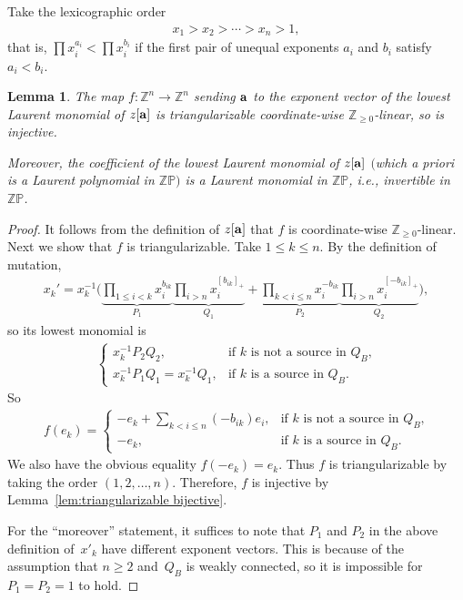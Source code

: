 \documentclass[pdftex]{sigma}
\numberwithin{equation}{section}
\newtheorem{Lemma}[Theorem]{Lemma}
\begin{document}
Take the lexicographic order
\begin{gather*}
x_1>x_2>\cdots >x_n>1,
\end{gather*}
 that is, $\prod x_i^{a_i}< \prod x_i^{b_i}$ if the f\/irst pair of unequal exponents $a_i$ and $b_i$ satisfy $a_i<b_i$.



\begin{Lemma}\label{lem:l injective}
The map $f\colon \mathbb{Z}^n\to\mathbb{Z}^n$ sending ${\bf a}$ to the exponent vector of the lowest Laurent monomial of $z[{\bf a}]$ is triangularizable coordinate-wise $\mathbb{Z}_{\ge0}$-linear, so is injective.

Moreover, the coefficient of the lowest Laurent monomial of $z[{\bf a}]$ $($which a priori is a Laurent polynomial in $\mathbb{ZP})$ is a Laurent monomial in $\mathbb{ZP}$, i.e., invertible in $\mathbb{ZP}$.
\end{Lemma}

\begin{proof}
It follows from the def\/inition of $z[{\bf a}]$ that $f$ is coordinate-wise $\mathbb{Z}_{\ge0}$-linear.
Next we show that $f$ is triangularizable. Take $1\le k\le n$. By the def\/inition of mutation,
\begin{gather*}
x_k' = x_k^{-1} \Bigg( \underbrace{\prod_{1\leq i<k} x_i^{b_{ik}}}_{P_1} \underbrace{\prod_{i>n} x_i^{[b_{ik}]_+}}_{Q_1} + \underbrace{\prod_{k < i \leq n} x_i^{-b_{ik}}}_{P_2} \underbrace{\prod_{i>n} x_i^{[-b_{ik}]_+}}_{Q_2} \Bigg),
\end{gather*}
so its lowest monomial is
\begin{gather*}
 \begin{cases} x_k^{-1} P_2 Q_2, & \text{if $k$ is not a source in $Q_B$,}  \\ x_k^{-1} P_1Q_1=
x_k^{-1} Q_1, & \text{if $k$ is a source in $Q_B$.} \end{cases}
\end{gather*}
So
\begin{gather*}
 f(e_k)=\begin{cases} \displaystyle -e_k+\sum_{k<i\le n}(-b_{ik})e_i, & \text{if $k$ is not a source in $Q_B$,}  \\ -e_k, & \text{if $k$ is a source in $Q_B$.} \end{cases}
\end{gather*}
We also have the obvious equality $f(-e_k)=e_k$. Thus $f$ is triangularizable by taking the order $(1,2,\dots,n)$.
Therefore, $f$ is injective by Lemma~\ref{lem:triangularizable bijective}.

For the ``moreover'' statement, it suf\/f\/ices to note that $P_1$ and $P_2$ in the above def\/inition of~$x'_k$ have dif\/ferent  exponent vectors. This is because of the assumption that $n\ge 2$ and~$Q_B$ is weakly connected, so it is impossible for $P_1=P_2=1$ to hold.
\end{proof}
\end{document}
